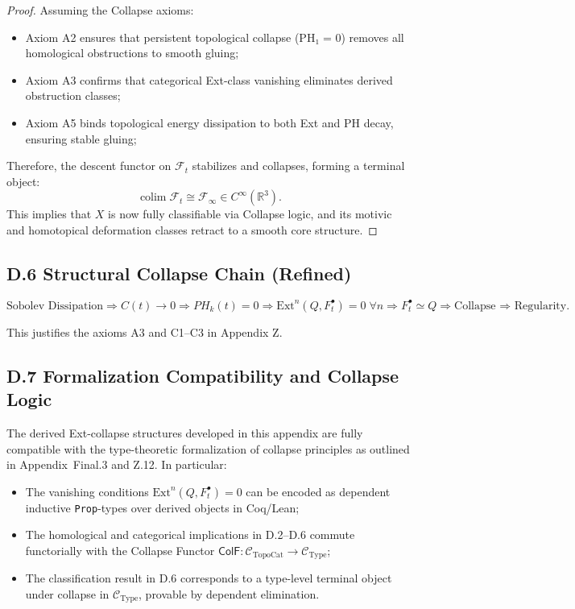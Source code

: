 \documentclass[11pt]{article}
\DeclareMathOperator{\colim}{colim}
\begin{document}
\begin{proof}
Assuming the Collapse axioms:
\begin{itemize}
  \item[\textbullet] Axiom A2 ensures that persistent topological collapse (PH₁ = 0) removes all homological obstructions to smooth gluing;
  \item[\textbullet] Axiom A3 confirms that categorical Ext-class vanishing eliminates derived obstruction classes;
  \item[\textbullet] Axiom A5 binds topological energy dissipation to both Ext and PH decay, ensuring stable gluing;
\end{itemize}
Therefore, the descent functor on \( \mathcal{F}_t \) stabilizes and collapses, forming a terminal object:
\[
\colim \mathcal{F}_t \cong \mathcal{F}_\infty \in C^\infty(\mathbb{R}^3).
\]
This implies that \( X \) is now fully classifiable via Collapse logic, and its motivic and homotopical deformation classes retract to a smooth core structure.  
\end{proof}


\subsection*{D.6 Structural Collapse Chain (Refined)}

\[
\text{Sobolev Dissipation}
\Rightarrow
C(t) \to 0
\Rightarrow
PH_k(t) = 0
\Rightarrow
\mathrm{Ext}^n(Q, F^\bullet_t) = 0 \; \forall n
\Rightarrow
F^\bullet_t \simeq Q
\Rightarrow
\text{Collapse ⇒ Regularity}.
\]

This justifies the axioms A3 and C1–C3 in Appendix Z.

\subsection*{D.7 Formalization Compatibility and Collapse Logic}

The derived Ext-collapse structures developed in this appendix are fully compatible with the  
type-theoretic formalization of collapse principles as outlined in Appendix~Final.3 and Z.12.  
In particular:

\begin{itemize}
  \item The vanishing conditions \( \mathrm{Ext}^n(Q, F_t^\bullet) = 0 \) can be encoded as dependent inductive \texttt{Prop}-types over derived objects in Coq/Lean;
  \item The homological and categorical implications in D.2–D.6 commute functorially with the Collapse Functor \( \mathsf{ColF} \colon \mathcal{C}_{\mathrm{TopoCat}} \to \mathcal{C}_{\mathrm{Type}} \);
  \item The classification result in D.6 corresponds to a type-level terminal object under collapse in \( \mathcal{C}_{\mathrm{Type}} \), provable by dependent elimination.
\end{itemize}
\end{document}
